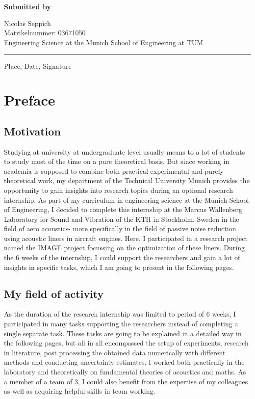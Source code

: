 \documentclass[11pt]{report} %
\newcommand{\EingereichtVon}{%
    Nicolas Seppich\\
    Matrikelnummer: 03671050\\
    Engineering Science at the Munich School of Engineering at TUM}
\newcommand{\Ort}{%
    Place}
\newcommand{\Datum}{%
    Date}
\begin{document}
\vspace*{6.3mm}
\textbf{Submitted by}\tab 
\begin{minipage}[t]{\textwidth-\CurrentLineWidth}
\EingereichtVon
\end{minipage}
\vspace*{-1mm}

\rule[-3.7mm]{\linewidth}{0.5pt}
\Ort{}, \Datum{}, Signature


\chapter{Preface}
\section{Motivation}
Studying at university at undergraduate level usually means to a lot of students to study most of the time on a pure theoretical basis.
But since working in academia is supposed to combine both practical experimental and purely theoretical work, my department of the Technical University Munich provides the opportunity to gain insights into research topics during an optional research internship.
As part of my curriculum in engineering science at the Munich School of Engineering, I decided to complete this internship at the Marcus Wallenberg Laboratory for Sound and Vibration of the KTH in Stockholm, Sweden in the field of aero acoustics-
more specifically in the field of passive noise reduction using acoustic liners in aircraft engines. Here, I participated in a research project named the IMAGE project focussing on the optimization of these liners. 
During the 6 weeks of the internship, I could support the researchers and gain a lot of insights in specific tasks, which I am going to present in the following pages. 

\section{My field of activity} 
As the duration of the research internship was limited to period of 6 weeks, I participated in many tasks supporting the researchers instead of completing a single separate task.
These tasks are going to be explained in a detailed way in the following pages, but all in all encompassed the setup of experiments, research in literature, post processing the obtained data numerically with different methods and conducting uncertainty estimates.
I worked both practically in the laboratory and theoretically on fundamental theories of acoustics and maths.
As a member of a team of 3, I could also benefit from the expertise of my colleagues as well as acquiring helpful skills in team working. 
\end{document}
